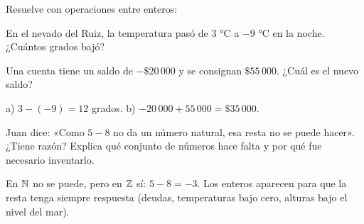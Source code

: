 \documentclass[11pt]{article}
\begin{document}
\begin{preguntas}
\pregunta[1] Resuelve con operaciones entre enteros:
\begin{opciones}
  \item En el nevado del Ruiz, la temperatura pasó de $3$ °C a $-9$ °C en la noche. ¿Cuántos grados bajó?
  \item Una cuenta tiene un saldo de $-\$20\,000$ y se consignan $\$55\,000$. ¿Cuál es el nuevo saldo?
\end{opciones}
\begin{solucion}[3cm]
a) $3 - (-9) = 12$ grados. b) $-20\,000 + 55\,000 = \$35\,000$.
\end{solucion}

\pregunta[1] Juan dice: «Como $5 - 8$ no da un número natural, esa resta no se puede hacer».
¿Tiene razón? Explica qué conjunto de números hace falta y por qué fue necesario inventarlo.
\begin{solucion}
En $\mathbb{N}$ no se puede, pero en $\mathbb{Z}$ sí: $5 - 8 = -3$. Los enteros aparecen para que la resta
tenga siempre respuesta (deudas, temperaturas bajo cero, alturas bajo el nivel del mar).
\end{solucion}

\end{preguntas}
\end{document}
